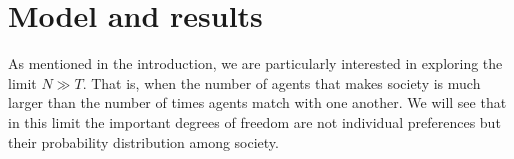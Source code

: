 \documentclass[12pt]{article}
\begin{document}
\section{Model and results}
\label{model}








As mentioned in the introduction, we are particularly interested in exploring the limit $N\gg T$. That is, when the number of agents that makes society is much larger than the number of times agents match with one another. We will see that in this limit the important degrees of freedom are not individual preferences but their probability distribution among society. %
\end{document}
